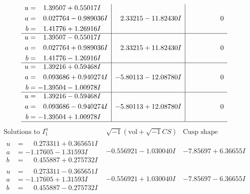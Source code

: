 \documentclass[1p]{elsarticle_modified}
\theoremstyle{definition}
\newcommand{\I}{\sqrt{-1}}
\begin{document}
$$\begin{array}{c|c|c}
\begin{aligned}
u &= \phantom{-}1.39507 + 0.55017 I \\
a &= \phantom{-}0.027764 - 0.989036 I \\
b &= \phantom{-}1.41776 + 1.26916 I\end{aligned}
 & \phantom{-}2.33215 - 11.82430 I & \phantom{-0.000000 } 0 \\ \hline\begin{aligned}
u &= \phantom{-}1.39507 - 0.55017 I \\
a &= \phantom{-}0.027764 + 0.989036 I \\
b &= \phantom{-}1.41776 - 1.26916 I\end{aligned}
 & \phantom{-}2.33215 + 11.82430 I & \phantom{-0.000000 } 0 \\ \hline\begin{aligned}
u &= \phantom{-}1.39216 + 0.59468 I \\
a &= \phantom{-}0.093686 + 0.940274 I \\
b &= -1.39504 - 1.00978 I\end{aligned}
 & -5.80113 - 12.08780 I & \phantom{-0.000000 } 0 \\ \hline\begin{aligned}
u &= \phantom{-}1.39216 - 0.59468 I \\
a &= \phantom{-}0.093686 - 0.940274 I \\
b &= -1.39504 + 1.00978 I\end{aligned}
 & -5.80113 + 12.08780 I & \phantom{-0.000000 } 0\\
 \hline 
 \end{array}$$\newpage$$\begin{array}{c|c|c}  
\text{Solutions to }I^u_{1}& \I (\text{vol} + \sqrt{-1}CS) & \text{Cusp shape}\\
 \hline 
\begin{aligned}
u &= \phantom{-}0.273311 + 0.365651 I \\
a &= -1.17605 - 1.31593 I \\
b &= \phantom{-}0.455887 + 0.275732 I\end{aligned}
 & -0.556921 - 1.030040 I & -7.85697 + 6.36655 I \\ \hline\begin{aligned}
u &= \phantom{-}0.273311 - 0.365651 I \\
a &= -1.17605 + 1.31593 I \\
b &= \phantom{-}0.455887 - 0.275732 I\end{aligned}
 & -0.556921 + 1.030040 I & -7.85697 - 6.36655 I \\ \hline\begin{aligned}

\end{aligned}
\end{array}$$
\end{document}
